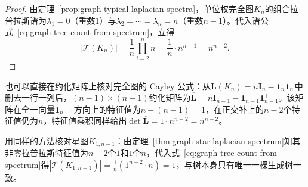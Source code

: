 \begin{proof}
由定理~\ref{prop:graph-typical-laplacian-spectra}，单位权完全图$K_n$的组合拉普拉斯谱为$\lambda_1=0$（重数$1$）与$\lambda_2=\cdots=\lambda_n=n$（重数$n-1$）。代入谱公式~\eqref{eq:graph-tree-count-from-spectrum}，立得
\[
  |\mathcal T(K_n)|=\frac{1}{n}\prod_{i=2}^n n=\frac{1}{n}\cdot n^{n-1}=n^{n-2}.
\]
\end{proof}

也可以直接在约化矩阵上核对完全图的 Cayley 公式：从$\bm L(K_n)=n\bm I_n-\bm 1_n\bm 1_n^\top$中删去一行一列后，$(n-1)\times(n-1)$约化矩阵为$\overline{\bm L}=n\bm I_{n-1}-\bm 1_{n-1}\bm 1_{n-1}^\top$。该矩阵在全一向量$\bm 1_{n-1}$方向上的特征值为$n-(n-1)=1$，在正交补上的$n-2$个特征值仍为$n$，特征值乘积同样给出$\det\overline{\bm L}=1\cdot n^{n-2}=n^{n-2}$。

用同样的方法核对星图$K_{1,n-1}$：由定理~\ref{thm:graph-star-laplacian-spectrum}知其非零拉普拉斯特征值为$n-2$个$1$和$1$个$n$，代入式~\eqref{eq:graph-tree-count-from-spectrum}得$|\mathcal T(K_{1,n-1})|=\frac{1}{n}(1^{n-2}\cdot n)=1$，与树本身只有唯一一棵生成树一致。
